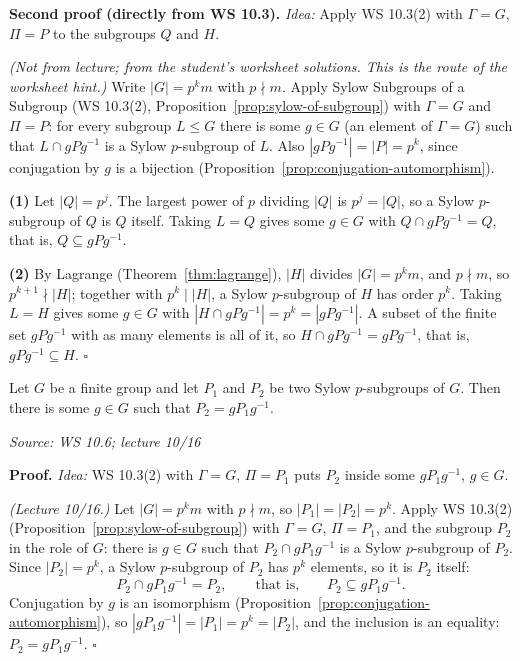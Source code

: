 \documentclass[11pt]{report}
\renewenvironment{proof}[1][Proof]{\noindent\textbf{#1.} }{\hfill$\square$\par\vspace{5pt}}
\newcommand{\srcline}[1]{\par\hfill{\footnotesize\textit{Source: #1}}}
\begin{document}
\begin{proof}[Second proof (directly from WS 10.3)]
\textit{Idea:} Apply WS 10.3(2) with $\Gamma = G$, $\Pi = P$ to the subgroups $Q$ and $H$.\par
\textit{(Not from lecture; from the student's worksheet solutions. This is the route of the worksheet hint.)} Write $|G| = p^k m$ with $p \nmid m$. Apply Sylow Subgroups of a Subgroup (WS 10.3(2), Proposition~\ref{prop:sylow-of-subgroup}) with $\Gamma = G$ and $\Pi = P$: for every subgroup $L \leq G$ there is some $g \in G$ (an element of $\Gamma = G$) such that $L \cap gPg^{-1}$ is a Sylow $p$-subgroup of $L$. Also $|gPg^{-1}| = |P| = p^k$, since conjugation by $g$ is a bijection (Proposition~\ref{prop:conjugation-automorphism}).

\textbf{(1)} Let $|Q| = p^j$. The largest power of $p$ dividing $|Q|$ is $p^j = |Q|$, so a Sylow $p$-subgroup of $Q$ is $Q$ itself. Taking $L = Q$ gives some $g \in G$ with $Q \cap gPg^{-1} = Q$, that is, $Q \subseteq gPg^{-1}$.

\textbf{(2)} By Lagrange (Theorem~\ref{thm:lagrange}), $|H|$ divides $|G| = p^k m$, and $p \nmid m$, so $p^{k+1} \nmid |H|$; together with $p^k \mid |H|$, a Sylow $p$-subgroup of $H$ has order $p^k$. Taking $L = H$ gives some $g \in G$ with $|H \cap gPg^{-1}| = p^k = |gPg^{-1}|$. A subset of the finite set $gPg^{-1}$ with as many elements is all of it, so $H \cap gPg^{-1} = gPg^{-1}$, that is, $gPg^{-1} \subseteq H$.
\end{proof}

\begin{thmbox}\label{thm:sylow-second}
Let $G$ be a finite group and let $P_1$ and $P_2$ be two Sylow $p$-subgroups of $G$. Then there is some $g \in G$ such that $P_2 = gP_1g^{-1}$.
\srcline{WS 10.6; lecture 10/16}
\end{thmbox}

\begin{proof}
\textit{Idea:} WS 10.3(2) with $\Gamma = G$, $\Pi = P_1$ puts $P_2$ inside some $gP_1g^{-1}$, $g \in G$.\par
\textit{(Lecture 10/16.)} Let $|G| = p^k m$ with $p \nmid m$, so $|P_1| = |P_2| = p^k$. Apply WS 10.3(2) (Proposition~\ref{prop:sylow-of-subgroup}) with $\Gamma = G$, $\Pi = P_1$, and the subgroup $P_2$ in the role of $G$: there is $g \in G$ such that $P_2 \cap gP_1g^{-1}$ is a Sylow $p$-subgroup of $P_2$. Since $|P_2| = p^k$, a Sylow $p$-subgroup of $P_2$ has $p^k$ elements, so it is $P_2$ itself:
\[ P_2 \cap gP_1g^{-1} = P_2, \qquad\text{that is,}\qquad P_2 \subseteq gP_1g^{-1}. \]
Conjugation by $g$ is an isomorphism (Proposition~\ref{prop:conjugation-automorphism}), so $|gP_1g^{-1}| = |P_1| = p^k = |P_2|$, and the inclusion is an equality: $P_2 = gP_1g^{-1}$.
\end{proof}
\end{document}
